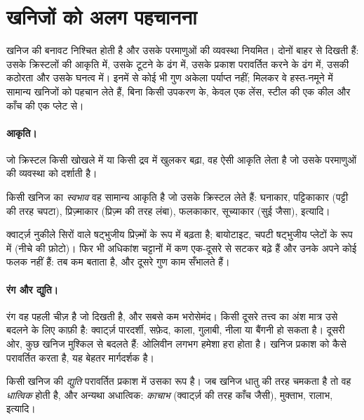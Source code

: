 \section{खनिजों को अलग पहचानना}

खनिज की बनावट निश्चित होती है और उसके परमाणुओं की व्यवस्था नियमित। दोनों
बाहर से दिखती हैं: उसके क्रिस्टलों की आकृति में, उसके टूटने के ढंग में, उसके
प्रकाश परावर्तित करने के ढंग में, उसकी कठोरता और उसके घनत्व में। इनमें से कोई भी गुण
अकेला पर्याप्त नहीं; मिलकर वे हस्त-नमूने में सामान्य खनिजों को पहचान लेते हैं,
बिना किसी उपकरण के, केवल एक लेंस, स्टील की एक कील और काँच की एक प्लेट से।

\paragraph{आकृति।} जो क्रिस्टल किसी खोखले में या किसी द्रव में खुलकर बढ़ा,
वह ऐसी आकृति लेता है जो उसके परमाणुओं की व्यवस्था को दर्शाती है।

\begin{definition}[स्वभाव]\label{def:g11:minerals:habit}
किसी खनिज का \emph{स्वभाव} वह सामान्य आकृति है
जो उसके क्रिस्टल लेते हैं: घनाकार, पट्टिकाकार (पट्टी की तरह चपटा), प्रिज़्माकार
(प्रिज़्म की तरह लंबा), फलकाकार, सूच्याकार (सुई जैसा), इत्यादि।
\end{definition}

क्वार्ट्ज़ नुकीले सिरों वाले षट्भुजीय प्रिज़्मों के रूप में बढ़ता है; बायोटाइट, चपटी
षट्भुजीय प्लेटों के रूप में (नीचे की फ़ोटो)। फिर भी अधिकांश चट्टानों में कण
एक-दूसरे से सटकर बढ़े हैं और उनके अपने कोई फलक नहीं हैं: तब  कम बताता है,
और दूसरे गुण काम सँभालते हैं।

\paragraph{रंग और द्युति।} रंग वह पहली चीज़ है जो दिखती है, और सबसे
कम भरोसेमंद। किसी दूसरे तत्त्व का अंश मात्र उसे बदलने के लिए काफ़ी है: क्वार्ट्ज़
पारदर्शी, सफ़ेद, काला, गुलाबी, नीला या बैंगनी हो सकता है। दूसरी ओर, कुछ खनिज
मुश्किल से बदलते हैं: ओलिवीन लगभग हमेशा हरा होता है। खनिज प्रकाश को
कैसे परावर्तित करता है, यह बेहतर मार्गदर्शक है।

\begin{definition}[द्युति]\label{def:g11:minerals:lustre}
किसी खनिज की \emph{द्युति} परावर्तित प्रकाश में उसका रूप है।
जब खनिज धातु की तरह चमकता है तो वह \emph{धात्विक} होती है, और
अन्यथा अधात्विक: \emph{काचाभ} (क्वार्ट्ज़ की तरह काँच जैसी), मुक्ताभ,
रालाभ, इत्यादि।
\end{definition}

